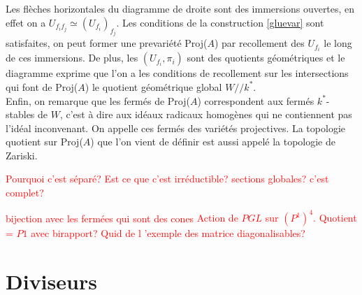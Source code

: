 \begin{multicols}{2}
	\begin{center}
	\\
	\end{center}
	
	\columnbreak
	\begin{center}
	\\
	\end{center}
\end{multicols}
Les flèches horizontales du diagramme de droite sont des immersions ouvertes, en effet on a $U_{f_if_j}\simeq (U_{f_i})_{f_j}$. Les conditions de la construction \ref{gluevar} sont satisfaites, on peut former une prevariété Proj($A$) par recollement des $U_{f_i}$ le long de ces immersions. De plus, les $(U_{f_i},\pi_i)$ sont des quotients géométriques et le diagramme exprime que l'on a les conditions de recollement sur les intersections qui font de Proj($A$) le quotient géométrique global $W//k^*$.\\
Enfin, on remarque que les fermés de Proj($A$) correspondent aux fermés $k^*$-stables de $W$, c'est à dire aux idéaux radicaux homogènes qui ne contiennent pas l'idéal inconvenant. On appelle ces fermés des variétés projectives. La topologie quotient sur Proj($A$) que l'on vient de définir est aussi appelé la topologie de Zariski.

\textcolor{red}{Pourquoi c'est séparé?}
\textcolor{red}{Est ce que c'est irréductible?}
\textcolor{red}{sections globales? c'est complet?}

\textcolor{red}{bijection avec les fermées qui sont des cones}
\textcolor{red}{Action de $PGL$ sur $(P^1)^4$. Quotient = $P1$ avec birapport?}
\textcolor{red}{Quid de l 'exemple des matrice diagonalisables?}


\section{Diviseurs}

